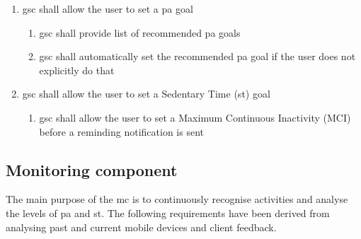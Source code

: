     \begin{enumerate}
        \item \gls{gsc} shall allow the user to set a \gls{pa} goal
        \begin{enumerate}
            \item \gls{gsc} shall provide list of recommended \gls{pa} goals
            \item \gls{gsc} shall automatically set the recommended \gls{pa} goal if the user does not explicitly do that 
        \end{enumerate}
        \item \gls{gsc} shall allow the user to set a Sedentary Time (\gls{st}) goal
        \begin{enumerate}
            \item \gls{gsc} shall allow the user to set a Maximum Continuous Inactivity (MCI) before a reminding notification is sent 
        \end{enumerate}
    \end{enumerate}
    
    
    \subsection{Monitoring component}
    \label{subsection:monitoring-component}
    The main purpose of the \gls{mc} is to continuously recognise activities and analyse the levels of \gls{pa} and \gls{st}. The following requirements have been derived from analysing past and current mobile devices and client feedback.
    
